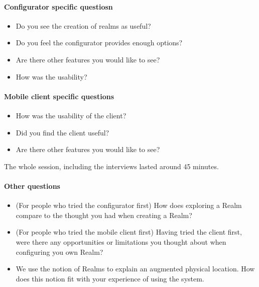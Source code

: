 \paragraph{Configurator specific questiosn} %
\label{par:configurator_specific_questiosn}
\begin{itemize}
	\item Do you see the creation of realms as useful?
	\item Do you feel the configurator provides enough options?
	\item Are there other features you would like to see?
	\item How was the usability?
\end{itemize}

\paragraph{Mobile client specific questions} %
\label{par:mobile_client_specific_questions}
\begin{itemize}
	\item How was the usability of the client?
	\item Did you find the client useful?
	\item Are there other features you would like to see?
\end{itemize}

The whole session, including the interviews lasted around 45 minutes.

\paragraph{Other questions} %
\label{par:other_questions}
\begin{itemize}
	\item (For people who tried the configurator first) How does exploring a Realm compare to the thought you had when creating a Realm?
	\item (For people who tried the mobile client first) Having tried the client first, were there any opportunities or limitations you thought about when configuring you own Realm?
	\item We use the notion of Realms to explain an augmented physical location. How does this notion fit with your experience of using the system.
\end{itemize}


